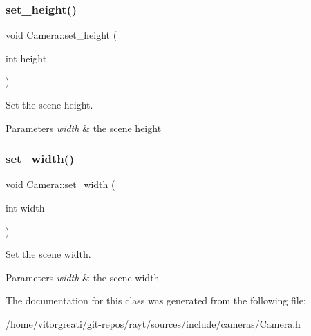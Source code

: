 \subsubsection{\texorpdfstring{set\_height()}{set\_height()}}
{\footnotesize\ttfamily void Camera\+::set\+\_\+height (\begin{DoxyParamCaption}\item[{int}]{height }\end{DoxyParamCaption})\hspace{0.3cm}{\ttfamily [inline]}}



Set the scene height. 


\begin{DoxyParams}{Parameters}
{\em width} & the scene height \\
\hline
\end{DoxyParams}
\mbox{\label{class_camera_a0c86ad9f103e2e06cd83f7fc6e8e4c91}} 
\subsubsection{\texorpdfstring{set\_width()}{set\_width()}}
{\footnotesize\ttfamily void Camera\+::set\+\_\+width (\begin{DoxyParamCaption}\item[{int}]{width }\end{DoxyParamCaption})\hspace{0.3cm}{\ttfamily [inline]}}



Set the scene width. 


\begin{DoxyParams}{Parameters}
{\em width} & the scene width \\
\hline
\end{DoxyParams}


The documentation for this class was generated from the following file\+:\begin{DoxyCompactItemize}
\item 
/home/vitorgreati/git-\/repos/rayt/sources/include/cameras/Camera.\+h\end{DoxyCompactItemize}
